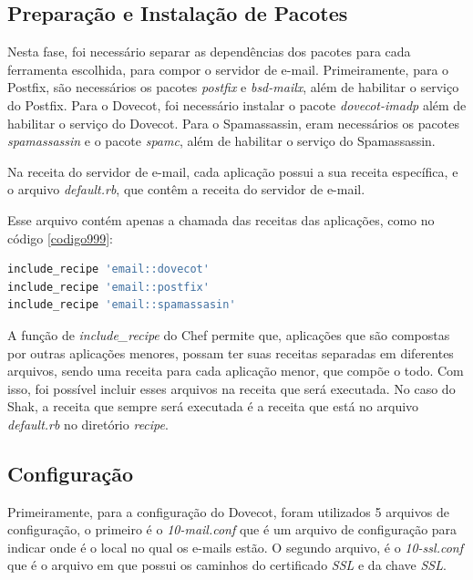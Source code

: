 \subsection{Preparação e Instalação de Pacotes }

Nesta fase, foi necessário separar as dependências dos pacotes para cada ferramenta
escolhida, para compor o servidor de e-mail. Primeiramente, para o Postfix, são necessários
os pacotes \textit{postfix} e \textit{bsd-mailx}, além de habilitar o serviço do 
Postfix. Para o Dovecot,
foi necessário instalar o pacote \textit{dovecot-imadp} além de habilitar o serviço do Dovecot. 
Para o Spamassassin, eram necessários os pacotes \textit{spamassassin} e o pacote
 \textit{spamc}, além de habilitar o serviço do Spamassassin.

Na receita do servidor de e-mail, cada aplicação possui a sua receita específica,
e o arquivo \textit{default.rb}, que contêm a receita do servidor de e-mail. 

Esse arquivo contém apenas a chamada das receitas das aplicações, como no código \ref{codigo999}:

\begin{lstlisting}[basicstyle=\ttfamily, language=Ruby,label=dice_index,caption={Exemplo da receita de e-mail
composta pelas receitas das outras aplicações}, label=codigo999]
include_recipe 'email::dovecot'
include_recipe 'email::postfix'
include_recipe 'email::spamassasin'
\end{lstlisting}

A função de \textit{include\_recipe} do Chef permite que, aplicações que são compostas
por outras aplicações menores, possam ter suas receitas separadas em diferentes arquivos,
sendo uma receita para cada aplicação menor, que compõe o todo. Com isso, foi possível 
incluir esses arquivos na receita que será executada. No caso do Shak, a receita
que sempre será executada é a receita que está no arquivo \textit{default.rb} no diretório \textit{recipe}.

\subsection{Configuração}

Primeiramente, para a configuração do Dovecot, foram utilizados 5 arquivos
de configuração, o primeiro é o \textit{10-mail.conf} que é um arquivo de configuração para
indicar onde é o local no qual os e-mails estão. O segundo arquivo, é o \textit{10-ssl.conf}
que é o arquivo em que possui os caminhos do certificado \textit{SSL} e da chave \textit{SSL}.


